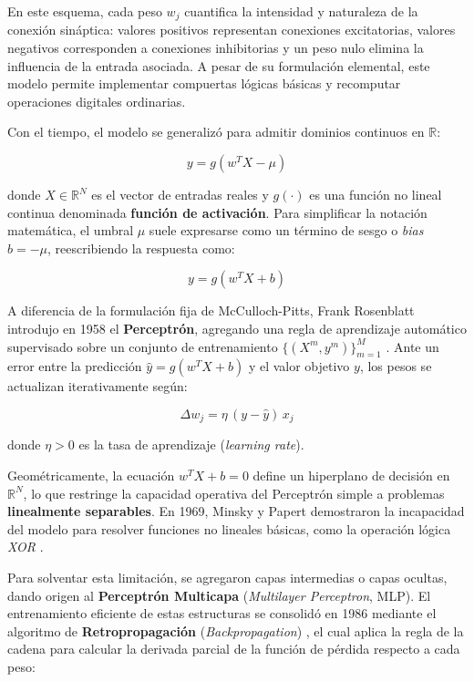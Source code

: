 En este esquema, cada peso $w_j$ cuantifica la intensidad y naturaleza de la conexión sináptica: valores positivos representan conexiones excitatorias, valores negativos corresponden a conexiones inhibitorias y un peso nulo elimina la influencia de la entrada asociada. A pesar de su formulación elemental, este modelo permite implementar compuertas lógicas básicas y recomputar operaciones digitales ordinarias.

Con el tiempo, el modelo se generalizó para admitir dominios continuos en $\mathbb{R}$:

\begin{equation}
    y = g \left( w^T X - \mu \right)
\end{equation}

donde $X \in \mathbb{R}^N$ es el vector de entradas reales y $g(\cdot)$ es una función no lineal continua denominada \textbf{función de activación}. Para simplificar la notación matemática, el umbral $\mu$ suele expresarse como un término de sesgo o \textit{bias} $b = -\mu$, reescribiendo la respuesta como:

\begin{equation}
    y = g \left( w^T X + b \right)
\end{equation}

A diferencia de la formulación fija de McCulloch-Pitts, Frank Rosenblatt introdujo en 1958 el \textbf{Perceptrón}, agregando una regla de aprendizaje automático supervisado sobre un conjunto de entrenamiento $\{(X^m, y^m)\}_{m=1}^M$ \cite{Hertz1991}. Ante un error entre la predicción $\hat{y} = g(w^T X + b)$ y el valor objetivo $y$, los pesos se actualizan iterativamente según:

\begin{equation}
    \Delta w_j = \eta \, (y - \hat{y}) \, x_j
\end{equation}

donde $\eta > 0$ es la tasa de aprendizaje (\textit{learning rate}).

Geométricamente, la ecuación $w^T X + b = 0$ define un hiperplano de decisión en $\mathbb{R}^N$, lo que restringe la capacidad operativa del Perceptrón simple a problemas \textbf{linealmente separables}. En 1969, Minsky y Papert demostraron la incapacidad del modelo para resolver funciones no lineales básicas, como la operación lógica \textit{XOR} \cite{Hertz1991}.

Para solventar esta limitación, se agregaron capas intermedias o capas ocultas, dando origen al \textbf{Perceptrón Multicapa} (\textit{Multilayer Perceptron}, MLP). El entrenamiento eficiente de estas estructuras se consolidó en 1986 mediante el algoritmo de \textbf{Retropropagación} (\textit{Backpropagation}) \cite{Hertz1991}, el cual aplica la regla de la cadena para calcular la derivada parcial de la función de pérdida respecto a cada peso:

